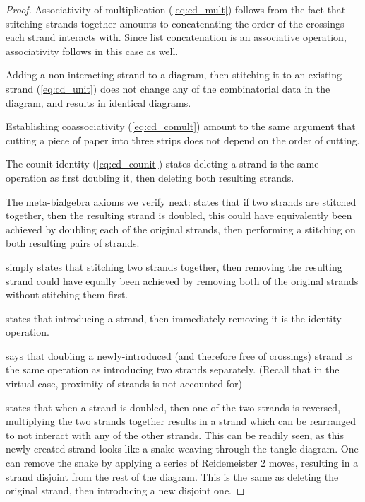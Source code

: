 \begin{proof}
        Associativity of multiplication (\cref{eq:cd_mult}) follows from the
        fact that stitching strands together amounts to concatenating the order
        of the crossings each strand interacts with. Since list concatenation is
        an associative operation, associativity follows in this case as well.

        Adding a non-interacting strand to a diagram, then stitching it to an
        existing strand (\cref{eq:cd_unit}) does not change any of the
        combinatorial data in the diagram, and results in identical diagrams.

        Establishing coassociativity (\cref{eq:cd_comult}) amount to the same
        argument that cutting a piece of paper into three strips does not depend
        on the order of cutting.

        The counit identity (\cref{eq:cd_counit}) states deleting a strand
        is the same operation as first doubling it, then deleting both resulting
        strands.

        The meta-bialgebra axioms we verify next:
         states that if two strands are stitched
        together, then the resulting strand is doubled, this could have
        equivalently been achieved by doubling each of the original strands,
        then performing a stitching on both resulting pairs of strands.

         simply states that stitching two strands
        together, then removing the resulting strand could have equally been
        achieved by removing both of the original strands without stitching them
        first.

         states that introducing a strand, then
        immediately removing it is the identity operation.

         says that doubling a newly-introduced (and
        therefore free of crossings) strand is the same operation as introducing
        two strands separately. (Recall that in the virtual case, proximity of
        strands is not accounted for)

         states that when a strand is doubled, then one of
        the two strands is reversed, multiplying the two strands together
        results in a strand which can be rearranged to not interact with any of
        the other strands. This can be readily seen, as this newly-created
        strand looks like a snake weaving through the tangle diagram. One can
        remove the snake by applying a series of Reidemeister 2 moves, resulting
        in a strand disjoint from the rest of the diagram. This is the same as
        deleting the original strand, then introducing a new disjoint one.
        

\end{proof}
